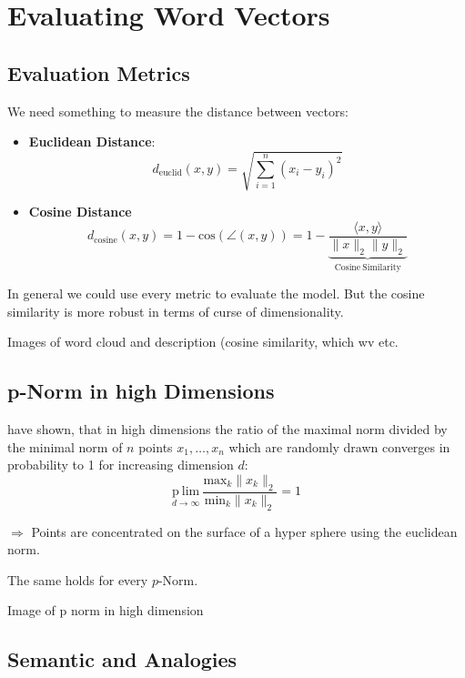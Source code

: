 \chapter{Evaluating Word Vectors}\label{ch:eval}

\section{Evaluation Metrics}

We need something to measure the distance between vectors:

\begin{itemize}
  \item 
    \textbf{Euclidean Distance}: 
    \[
      d_\mathrm{euclid}(x,y) = \sqrt{\sum\limits_{i=1}^n(x_i - y_i)^2}
    \]

  \item 
    \textbf{Cosine Distance}
    \[
      d_\mathrm{cosine}(x,y) = 1 - \mathrm{cos}(\angle (x, y)) = 
      1 - \underbrace{\frac{\langle x,y\rangle}{\|x\|_2\|y\|_2}}_{\mathrm{Cosine\ Similarity}}
    \]
\end{itemize}

In general we could use every metric to evaluate the model. But the 
cosine similarity is more robust in terms of curse of dimensionality.

{\Huge Images of word cloud and description (cosine similarity, which wv etc.}

\section{p-Norm in high Dimensions}

\cite{aggarwal2001surprising} have shown, that in high dimensions the ratio of the 
maximal norm divided by the minimal norm of $n$ points $x_1, \dots, x_n$
which are randomly drawn converges in probability to 1 for increasing
dimension $d$:
\[
\underset{{d\rightarrow\infty}}{\mathrm{p~lim}}\ \frac{\mathrm{max}_k \|x_k\|_2}{\mathrm{min}_k \|x_k\|_2} = 1
\]

$\Rightarrow$ Points are concentrated on the surface of a hyper sphere 
using the euclidean norm.

The same holds for every $p$-Norm.


{\Huge Image of p norm in high dimension}

\section{Semantic and Analogies}

